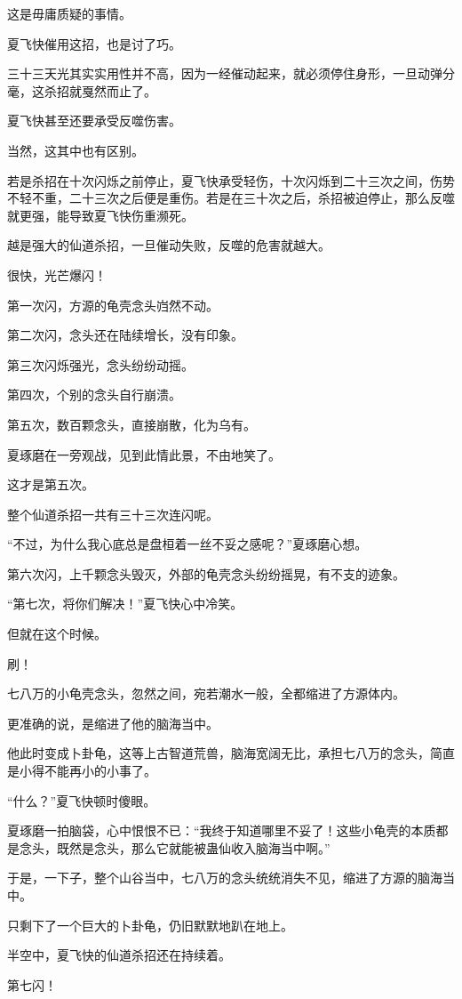\begin{this_body}
这是毋庸质疑的事情。

夏飞快催用这招，也是讨了巧。

三十三天光其实实用性并不高，因为一经催动起来，就必须停住身形，一旦动弹分毫，这杀招就戛然而止了。

夏飞快甚至还要承受反噬伤害。

当然，这其中也有区别。

若是杀招在十次闪烁之前停止，夏飞快承受轻伤，十次闪烁到二十三次之间，伤势不轻不重，二十三次之后便是重伤。若是在三十次之后，杀招被迫停止，那么反噬就更强，能导致夏飞快伤重濒死。

越是强大的仙道杀招，一旦催动失败，反噬的危害就越大。

很快，光芒爆闪！

第一次闪，方源的龟壳念头岿然不动。

第二次闪，念头还在陆续增长，没有印象。

第三次闪烁强光，念头纷纷动摇。

第四次，个别的念头自行崩溃。

第五次，数百颗念头，直接崩散，化为乌有。

夏琢磨在一旁观战，见到此情此景，不由地笑了。

这才是第五次。

整个仙道杀招一共有三十三次连闪呢。

“不过，为什么我心底总是盘桓着一丝不妥之感呢？”夏琢磨心想。

第六次闪，上千颗念头毁灭，外部的龟壳念头纷纷摇晃，有不支的迹象。

“第七次，将你们解决！”夏飞快心中冷笑。

但就在这个时候。

刷！

七八万的小龟壳念头，忽然之间，宛若潮水一般，全都缩进了方源体内。

更准确的说，是缩进了他的脑海当中。

他此时变成卜卦龟，这等上古智道荒兽，脑海宽阔无比，承担七八万的念头，简直是小得不能再小的小事了。

“什么？”夏飞快顿时傻眼。

夏琢磨一拍脑袋，心中恨恨不已：“我终于知道哪里不妥了！这些小龟壳的本质都是念头，既然是念头，那么它就能被蛊仙收入脑海当中啊。”

于是，一下子，整个山谷当中，七八万的念头统统消失不见，缩进了方源的脑海当中。

只剩下了一个巨大的卜卦龟，仍旧默默地趴在地上。

半空中，夏飞快的仙道杀招还在持续着。

第七闪！


\end{this_body}
